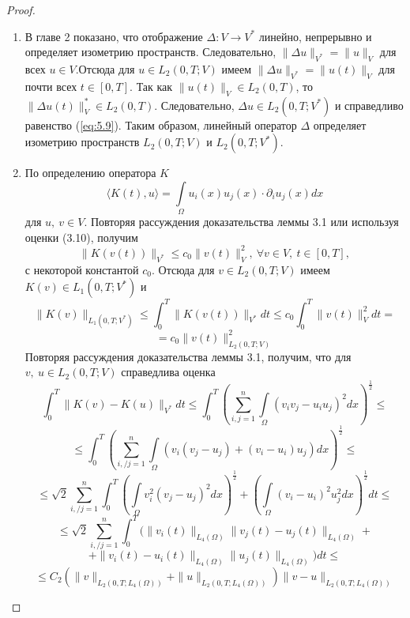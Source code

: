 \begin{proof} ~\\
    \begin{enumerate} 
        \item В главе 2 показано, что отображение $\Delta: V \rightarrow V^\ast$ линейно, непрерывно и определяет изометрию пространств.
        Следовательно, \linebreak $\parallel \Delta u \parallel_{V^\ast} = \parallel u \parallel_V$ для всех $u \in V$.Отсюда для $u \in L_2(0, T; V)$ имеем
        \linebreak $\parallel \Delta u \parallel_{V^\ast} = \parallel u(t) \parallel_V$ для почти всех $t \in [0, T]$.
        Так как $\parallel u(t) \parallel_V \in L_2(0, T)$,
        то $\parallel \Delta u(t)\parallel_V^\ast \in L_2(0, T)$. Следовательно, $\Delta u \in L_2(0, T; V^\ast)$ и справедливо
        равенство (\ref{eq:5.9}). Таким образом, линейный оператор $\Delta$ определяет изометрию пространств $L_2(0, T; V)$ и $L_2(0, T; V^\ast)$.
        \item По определению оператора $K$
        $$\langle K(t), u \rangle = \int\limits_\Omega u_i(x )u_j(x) \cdot \partial_i u_j(x) dx$$
        для $u, \ v \in V$. Повторяя рассуждения доказательства леммы 3.1 или используя оценки (3.10), получим
        $$\parallel K(v(t)) \parallel_{V^\ast} \le c_0 \parallel v(t) \parallel^2_V, \ \forall v \in V, \ t \in [0, T],$$
        с некоторой константой $c_0$.
        Отсюда для $v \in L_2(0, T; V)$ имеем $K(v) \in L_1(0, T; V^\ast)$ и
        $$\parallel K(v)\parallel_{L_1(0, T; V^*)}\le\int_0^T\parallel K(v(t))\parallel_{V^*}dt\le c_0\int_0^T\parallel v(t)\parallel_V^2dt=$$
        $$=c_0\parallel v(t)\parallel_{L_2(0, T; V)}^2$$
        Повторяя рассуждения доказательства леммы 3.1, получим, что для $v, \ u \in L_2(0, T; V)$ справедлива оценка
        $$\int_0^T \parallel K(v)-K(u)\parallel_{V^*}dt\le\int_0^T (\sum_{i, j=1}^n\int\limits_\Omega (v_iv_j-u_iu_j)^2dx)^\frac{1}{2}\le$$
        $$\le\int_0^T(\sum_{i, / j=1}^n\int\limits_\Omega (v_i(v_j-u_j)+(v_i-u_i)u_j)dx)^\frac{1}{2}\le$$
        $$\le\sqrt{2}\sum_{i, / j=1}^n\int_0^T(\int\limits_\Omega v_i^2(v_j-u_j)^2dx)^\frac{1}{2}+(\int\limits_\Omega(v_i-u_i)^2u_j^2dx)^\frac{1}{2}dt\le$$
        $$\le\sqrt{2}\sum_{i, / j=1}^n\int_0^T(\parallel v_i(t)\parallel_{L_4(\Omega)}\parallel v_j(t)-u_j(t)\parallel_{L_4(\Omega)}+$$
        $$+\parallel v_i(t)-u_i(t)\parallel_{L_4(\Omega)}\parallel u_j(t)\parallel_{L_4(\Omega)})dt\le$$
        $$\le C_2(\parallel v \parallel_{L_2(0, T; L_4(\Omega))}+
        \parallel u \parallel_{L_2(0, T; L_4(\Omega))})\parallel v-u\parallel_{L_2(0, T; L_4(\Omega))}$$

\end{enumerate}
\end{proof}
